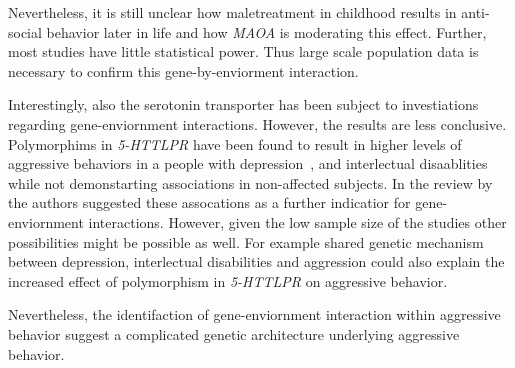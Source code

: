 Nevertheless, it is still unclear how maletreatment in childhood results in anti-social behavior later in life and how \textit{MAOA} is moderating this effect.
Further, most studies have little statistical power.
Thus large scale population data is necessary to confirm this gene-by-enviorment interaction.

Interestingly, also the serotonin transporter has been subject to investiations regarding gene-enviornment interactions.
However, the results are less conclusive.
Polymorphims in \textit{5-HTTLPR} have been found to result in higher levels of aggressive behaviors in a people with depression~\cite{Gonda2011}, and interlectual disaablities~\cite{May2010} while not demonstarting associations in non-affected subjects.
In the review by~\citet{Anholt2012} the authors suggested these assocations as a further indicatior for gene-enviornment interactions.
However, given the low sample size of the studies other possibilities might be possible as well.
For example shared genetic mechanism between depression, interlectual disabilities and aggression could also explain the increased effect of polymorphism in \textit{5-HTTLPR} on aggressive behavior. 

Nevertheless, the identifaction of gene-enviornment interaction within aggressive behavior suggest a complicated genetic architecture underlying aggressive behavior.
